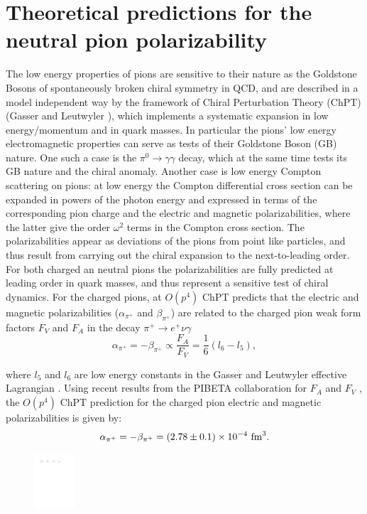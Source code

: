 \section{Theoretical predictions for the neutral pion polarizability}
The low energy properties of pions are sensitive to their nature as
the Goldstone Bosons of spontaneously broken chiral symmetry in QCD,
and are described in a model independent way by the framework of
Chiral Perturbation Theory (ChPT) (Gasser and Leutwyler
\cite{Gasser:1983yg}), which implements a systematic expansion in low
energy/momentum and in quark masses.  In particular the pions' low
energy electromagnetic properties can serve as tests of their
Goldstone Boson (GB) nature. One such a case is the $\pi^0\to
\gamma\gamma$ decay, which at the same time tests its GB nature and
the chiral anomaly. Another case is low energy Compton scattering on
pions: at low energy the Compton differential cross section can be
expanded in powers of the photon energy and expressed in terms of the
corresponding pion charge and the electric and magnetic
polarizabilities, where the latter give the order $\omega^2$ terms in
the Compton cross section. The polarizabilities appear as deviations
of the pions from point like particles, and thus result from carrying
out the chiral expansion to the next-to-leading order. For both
charged an neutral pions the polarizabilities are fully predicted at
leading order in quark masses, and thus represent a sensitive test of
chiral dynamics. For the charged pions, at $O(p^4)$ ChPT predicts that
the electric and magnetic polarizabilities ($\alpha_{\pi^+}$ and
$\beta_{\pi^+}$) are related to the charged pion weak form factors
$F_V$ and $F_A$ in the decay $\pi^+ \rightarrow e^+ \nu \gamma$
\begin{equation}\label{alpha_and_beta}
\alpha_{\pi^+} = -\beta_{\pi^+} \propto \frac{F_A}{F_V} = \frac{1}{6} ( l_6 - l_5 ),
\end{equation}

\noindent where $l_5$ and $l_6$ are low energy constants in the Gasser
and Leutwyler effective Lagrangian \cite{Gasser:1983yg}.  Using recent
results from the PIBETA collaboration for $F_A$ and $F_V$
\cite{Bychkov:2008ws}, the $O(p^4)$ ChPT prediction for the charged
pion electric and magnetic polarizabilities is given by:
\begin{equation}\label{one_loop}
\alpha_{\pi^+} = -\beta_{\pi^+} = (2.78 \pm 0.1) \times 10^{-4}~{\rm fm}^3.
\end{equation}
\begin{figure}[h]
\begin{center}
\includegraphics[height=2cm,angle=0]{figures/Fig-TP-1.pdf}
\end{center}
\caption{
\label{fig:digrams}}
\end{figure}


